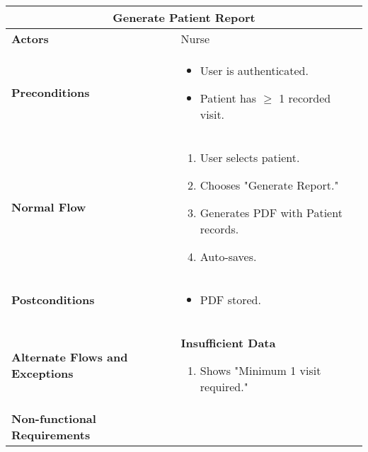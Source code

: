 \documentclass{article}
\begin{document}
\renewcommand{\arraystretch}{1.3} %

\begin{longtable}{| p{5cm} | p{10cm} |}
    \hline
    \multicolumn{2}{|c|}{\textbf{Generate Patient Report}} \\
    \hline
    \textbf{Actors} & Nurse \\
    \hline
    \textbf{Preconditions} & 
    \begin{itemize}
        \item User is authenticated.
        \item Patient has $\geq$ 1 recorded visit.
    \end{itemize} \\
    \hline
    \textbf{Normal Flow} & 
    \begin{enumerate}
        \item User selects patient.
        \item Chooses "Generate Report."
        \item Generates PDF with Patient records.
        \item Auto-saves.
    \end{enumerate} \\
    \hline
    \textbf{Postconditions} & 
    \begin{itemize}
        \item PDF stored.
    \end{itemize} \\
    \hline
    \textbf{Alternate Flows and Exceptions} & 
    \textbf{Insufficient Data}  
    \begin{enumerate}
        \item Shows "Minimum 1 visit required."
    \end{enumerate} \\
    \hline
    \textbf{Non-functional Requirements} &  \\
    \hline
\end{longtable}

\renewcommand{\arraystretch}{1.3} %
\end{document}
